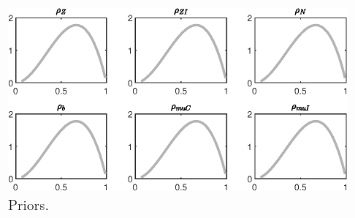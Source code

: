 \begin{figure}[H]
\centering
\includegraphics[width=0.80\textwidth]{BRS_sectoral_wo_demand_shocks/graphs/BRS_sectoral_wo_demand_shocks_Priors4}
\caption{Priors.}\label{Fig:Priors:4}
\end{figure}
 
